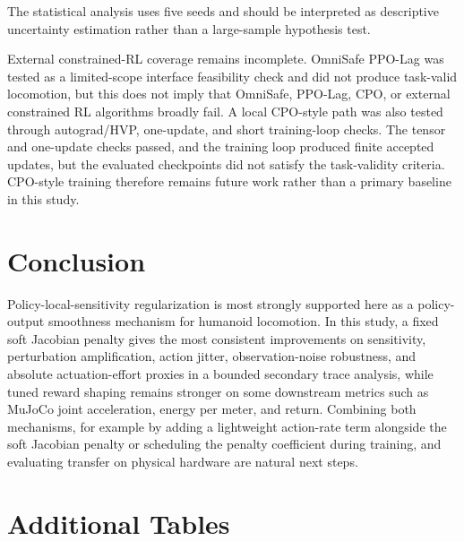 \documentclass[10pt]{article}
\newif\ifsetpaperbibstyle
\begin{document}
The statistical analysis uses five seeds and should be interpreted as
descriptive uncertainty estimation rather than a large-sample hypothesis test.

External constrained-RL coverage remains incomplete. OmniSafe PPO-Lag was
tested as a limited-scope interface feasibility check and did not produce task-valid
locomotion, but this does not imply that OmniSafe, PPO-Lag, CPO, or external
constrained RL algorithms broadly fail. A local CPO-style path was also tested
through autograd/HVP, one-update, and short training-loop checks. The tensor
and one-update checks passed, and the training loop produced finite accepted
updates, but the evaluated checkpoints did not satisfy the task-validity
criteria. CPO-style training therefore remains future work rather than a primary
baseline in this study.

\section{Conclusion}

Policy-local-sensitivity regularization is most strongly supported here as a
policy-output smoothness mechanism for humanoid locomotion. In this study, a
fixed soft Jacobian penalty gives the most consistent improvements on
sensitivity, perturbation amplification, action jitter, observation-noise
robustness, and absolute actuation-effort proxies in a bounded secondary trace
analysis, while tuned reward shaping remains stronger on some downstream
metrics such as MuJoCo joint acceleration, energy per meter, and return.
Combining both mechanisms, for example by adding a lightweight action-rate term
alongside the soft Jacobian penalty or scheduling the penalty coefficient
during training, and evaluating transfer on physical hardware are natural next
steps.

\ifsetpaperbibstyle

\fi


\appendix

\section{Additional Tables}
\end{document}
